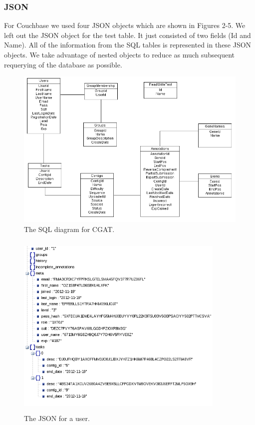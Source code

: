 \documentclass[]{IEEEtran}
\begin{document}
\subsubsection{JSON}
For Couchbase we used four JSON objects which are shown in Figures 2-5. We left out the JSON object for the test table. It just consisted of two fields (Id and Name). All of the information from the SQL tables is represented in these JSON objects. We take advantage of nested objects to reduce as much subsequent requerying of the database as possible.

\begin{figure}%
	\includegraphics[width=5.5in]{SQLDiagram.png}%
	\caption{The SQL diagram for CGAT.}
	\label{fig:SQLDiagram}
\end{figure}%

\clearpage

\begin{figure}%
	\includegraphics[height=90mm,width=100mm]{user.png}
	\caption{The JSON for a user.}
	\label{fig:JSON-user}
\end{figure}%
\end{document}
